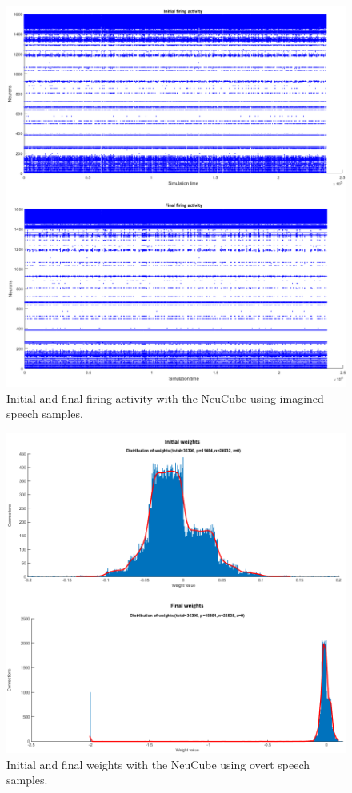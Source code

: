 \begin{figure}[h!]
\centering
\includegraphics[width=\linewidth]{Figures/NeuCube_FA_Imagined.png}
\caption{Initial and final firing activity with the NeuCube using imagined speech samples.}
\label{Fig: NeuCube_FA_Imagined}
\end{figure}

\begin{figure}[h!]
\centering
\includegraphics[scale=0.44]{Figures/NeuCube_Weights_Overt.png}
\caption{Initial and final weights with the NeuCube using overt speech samples.}
\label{Fig: NeuCube_Weights_Overt}
\end{figure}

